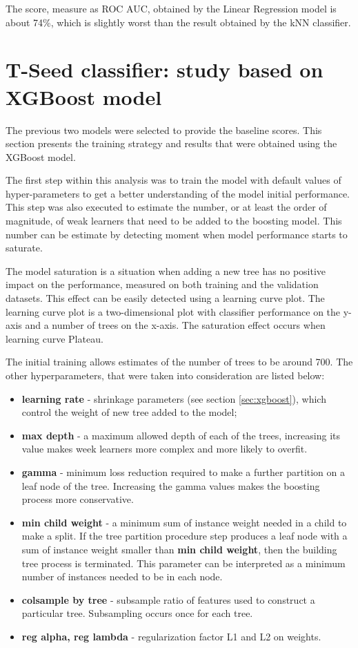 The score, measure as ROC AUC, obtained by the Linear Regression model is about 74\%, which is slightly worst than the result obtained by the kNN classifier.  

\section{T-Seed classifier: study based on XGBoost model}

The previous two models were selected to provide the baseline scores. This section presents the training strategy and results that were obtained using the XGBoost model. 

The first step within this analysis was to train the model with default values of hyper-parameters to get a better understanding of the model initial performance. This step was also executed to estimate the number, or at least the order of magnitude, of weak learners that need to be added to the boosting model. This number can be estimate by detecting moment when model performance starts to saturate. 

The model saturation is a situation when adding a new tree has no positive impact on the performance, measured on both training and the validation datasets. This effect can be easily detected using a learning curve plot. The learning curve plot is a two-dimensional plot with classifier performance on the y-axis and a number of trees on the x-axis. The saturation effect occurs when learning curve Plateau. 

The initial training allows estimates of the number of trees to be around 700. The other hyperparameters, that were taken into consideration are listed below:

\begin{itemize}
    \item \textbf{learning rate} - shrinkage parameters (see section \ref{sec:xgboost}), which control the weight of new tree added to the model;    
    \item \textbf{max depth} - a maximum allowed depth of each of the trees, increasing its value makes week learners more complex and more likely to overfit. 
    \item \textbf{gamma} - minimum loss reduction required to make a further partition on a leaf node of the tree. Increasing the gamma values makes the boosting process more conservative. 
    \item \textbf{min child weight} - a minimum sum of instance weight needed in a child to make a split. If the tree partition procedure step produces a leaf node with a sum of instance weight smaller than \textbf{min child weight}, then the building tree process is terminated. This parameter can be interpreted as a minimum number of instances needed to be in each node.
    \item \textbf{colsample by tree} - subsample ratio of features used to construct a particular tree. Subsampling occurs once for each tree. 
    \item \textbf{reg alpha, reg lambda} - regularization factor L1 and L2 on weights.      
    
\end{itemize}

